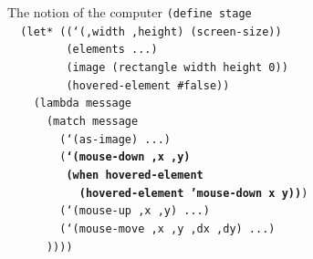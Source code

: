 \documentclass{beamer}
\begin{document}
\begin{frame}{The notion of the computer}
  \scriptsize
  \texttt{(define stage\\
    \ \ (let* ((`(,width ,height) (screen-size))\\
    \ \ \ \ \ \ \ \ \ (elements ...)\\
    \ \ \ \ \ \ \ \ \ (image (rectangle width height 0))\\
    \ \ \ \ \ \ \ \ \ (hovered-element \#false))\\
    \ \ \ \ (lambda message\\
    \ \ \ \ \ \ (match message\\
    \ \ \ \ \ \ \ \ (`(as-image) ...)\\
    \ \ \ \ \ \ \ \ (\textbf{`(mouse-down ,x ,y)\\
    \ \ \ \ \ \ \ \ \ (when hovered-element\\
    \ \ \ \ \ \ \ \ \ \ \ (hovered-element 'mouse-down x y))})\\
    \ \ \ \ \ \ \ \ (`(mouse-up ,x ,y) ...)\\
    \ \ \ \ \ \ \ \ (`(mouse-move ,x ,y ,dx ,dy) ...)\\
    \ \ \ \ \ \ ))))\\
    \ \\
    \ \\
    \ \\
    \ \\
    \ \\
    \ \\
    \ \\
    \ \\
    \ 
}
\end{frame}
\end{document}
